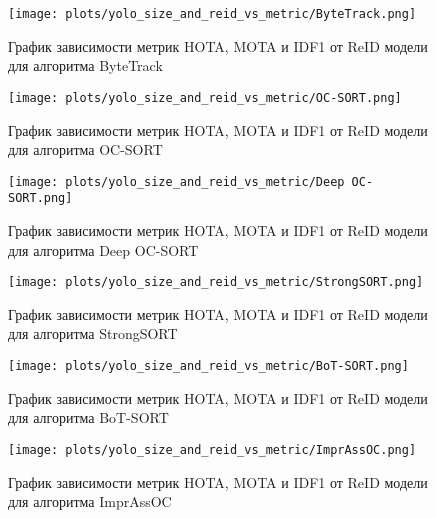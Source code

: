 \begin{figure}[ht]
    \centering
    \texttt{[image: plots/yolo\_size\_and\_reid\_vs\_metric/ByteTrack.png]}
    \caption{График зависимости метрик HOTA, MOTA и IDF1 от ReID модели для алгоритма ByteTrack}
    \label{fig:yolo_reid_ByteTrack}
\end{figure}

\begin{figure}[ht]
    \centering
    \texttt{[image: plots/yolo\_size\_and\_reid\_vs\_metric/OC-SORT.png]}
    \caption{График зависимости метрик HOTA, MOTA и IDF1 от ReID модели для алгоритма OC-SORT}
    \label{fig:yolo_reid_OC-SORT}
\end{figure}

\begin{figure}[ht]
    \centering
    \texttt{[image: plots/yolo\_size\_and\_reid\_vs\_metric/Deep OC-SORT.png]}
    \caption{График зависимости метрик HOTA, MOTA и IDF1 от ReID модели для алгоритма Deep OC-SORT}
    \label{fig:yolo_reid_Deep OC-SORT}
\end{figure}

\begin{figure}[ht]
    \centering
    \texttt{[image: plots/yolo\_size\_and\_reid\_vs\_metric/StrongSORT.png]}
    \caption{График зависимости метрик HOTA, MOTA и IDF1 от ReID модели для алгоритма StrongSORT}
    \label{fig:yolo_reid_StrongSORT}
\end{figure}

\begin{figure}[ht]
    \centering
    \texttt{[image: plots/yolo\_size\_and\_reid\_vs\_metric/BoT-SORT.png]}
    \caption{График зависимости метрик HOTA, MOTA и IDF1 от ReID модели для алгоритма BoT-SORT}
    \label{fig:yolo_reid_BoT-SORT}
\end{figure}

\begin{figure}[ht]
    \centering
    \texttt{[image: plots/yolo\_size\_and\_reid\_vs\_metric/ImprAssOC.png]}
    \caption{График зависимости метрик HOTA, MOTA и IDF1 от ReID модели для алгоритма ImprAssOC}
    \label{fig:yolo_reid_ImprAssOC}
\end{figure}
\FloatBarrier